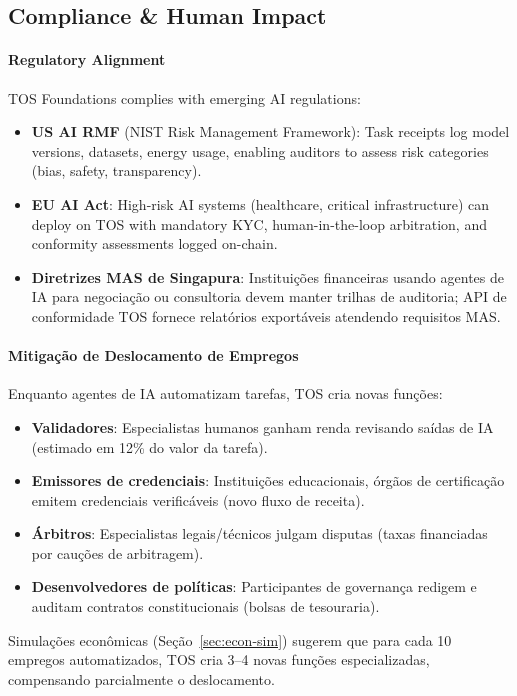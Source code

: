 \documentclass[11pt]{article}
\begin{document}
\subsection{Compliance \& Human Impact}
\paragraph{Regulatory Alignment} TOS Foundations complies with emerging AI regulations:
\begin{itemize}[noitemsep]
  \item \textbf{US AI RMF} (NIST Risk Management Framework): Task receipts log model versions, datasets, energy usage, enabling auditors to assess risk categories (bias, safety, transparency).
  \item \textbf{EU AI Act}: High-risk AI systems (healthcare, critical infrastructure) can deploy on TOS with mandatory KYC, human-in-the-loop arbitration, and conformity assessments logged on-chain.
  \item \textbf{Diretrizes MAS de Singapura}: Instituições financeiras usando agentes de IA para negociação ou consultoria devem manter trilhas de auditoria; API de conformidade TOS fornece relatórios exportáveis atendendo requisitos MAS.
\end{itemize}

\paragraph{Mitigação de Deslocamento de Empregos} Enquanto agentes de IA automatizam tarefas, TOS cria novas funções:
\begin{itemize}[noitemsep]
  \item \textbf{Validadores}: Especialistas humanos ganham renda revisando saídas de IA (estimado em 12\% do valor da tarefa).
  \item \textbf{Emissores de credenciais}: Instituições educacionais, órgãos de certificação emitem credenciais verificáveis (novo fluxo de receita).
  \item \textbf{Árbitros}: Especialistas legais/técnicos julgam disputas (taxas financiadas por cauções de arbitragem).
  \item \textbf{Desenvolvedores de políticas}: Participantes de governança redigem e auditam contratos constitucionais (bolsas de tesouraria).
\end{itemize}
Simulações econômicas (Seção~\ref{sec:econ-sim}) sugerem que para cada 10 empregos automatizados, TOS cria 3--4 novas funções especializadas, compensando parcialmente o deslocamento.
\end{document}
